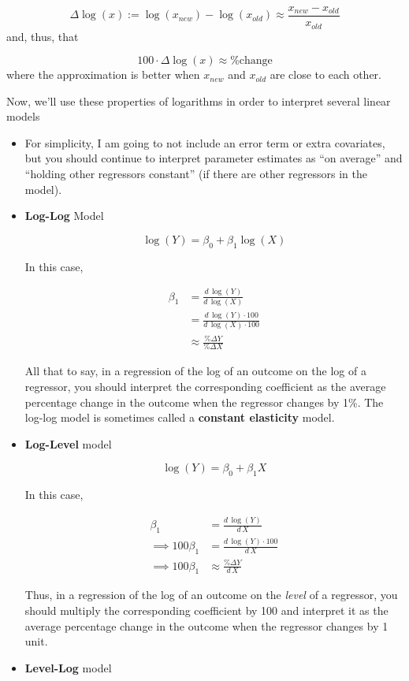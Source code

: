 \documentclass[
  letterpaper,
  DIV=11,
  numbers=noendperiod]{scrreprt}
\begin{document}
\[
  \Delta \log(x) := \log(x_{new}) - \log(x_{old}) \approx \frac{x_{new} - x_{old}}{x_{old}}
\] and, thus, that

\[
  100 \cdot \Delta \log(x) \approx \textrm{\% change}
\] where the approximation is better when \(x_{new}\) and \(x_{old}\)
are close to each other.

Now, we'll use these properties of logarithms in order to interpret
several linear models

\begin{itemize}
\item
  For simplicity, I am going to not include an error term or extra
  covariates, but you should continue to interpret parameter estimates
  as ``on average'' and ``holding other regressors constant'' (if there
  are other regressors in the model).
\item
  \textbf{Log-Log} Model

  \[
    \log(Y) = \beta_0 + \beta_1 \log(X)
    \]

  In this case,

  \[
    \begin{aligned}
    \beta_1 &= \frac{ d \, \log(Y) }{d \, \log(X)} \\
    &= \frac{ d \, \log(Y) \cdot 100 }{d \, \log(X) \cdot 100} \\
    &\approx \frac{ \% \Delta Y}{ \% \Delta X}
    \end{aligned}
    \]

  All that to say, in a regression of the log of an outcome on the log
  of a regressor, you should interpret the corresponding coefficient as
  the average percentage change in the outcome when the regressor
  changes by 1\%. The log-log model is sometimes called a
  \textbf{constant elasticity} model.
\item
  \textbf{Log-Level} model

  \[
    \log(Y) = \beta_0 + \beta_1 X
    \]

  In this case,

  \[
    \begin{aligned}
    \beta_1 &= \frac{ d \, \log(Y) }{d \, X} \\
    \implies 100 \beta_1 &= \frac{ d \, \log(Y) \cdot 100 }{d \, X} \\
    \implies 100 \beta_1 &\approx \frac{ \% \Delta Y}{ d \, X}
    \end{aligned}
    \]

  Thus, in a regression of the log of an outcome on the \emph{level} of
  a regressor, you should multiply the corresponding coefficient by 100
  and interpret it as the average percentage change in the outcome when
  the regressor changes by 1 unit.
\item
  \textbf{Level-Log} model


\end{itemize}
\end{document}
